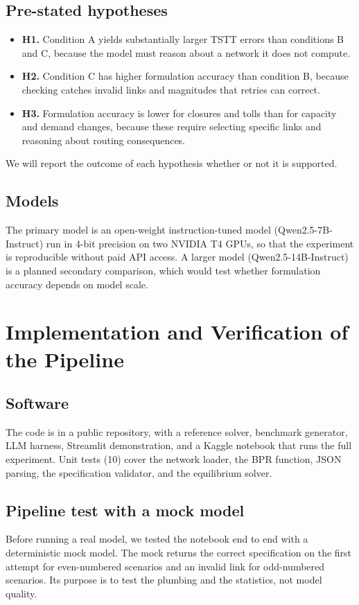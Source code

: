 \documentclass[11pt,a4paper]{article}
\begin{document}
\subsection{Pre-stated hypotheses}
\begin{itemize}[leftmargin=1.5em]
\item \textbf{H1.} Condition A yields substantially larger TSTT errors than conditions B and C, because the model must reason about a network it does not compute.
\item \textbf{H2.} Condition C has higher formulation accuracy than condition B, because checking catches invalid links and magnitudes that retries can correct.
\item \textbf{H3.} Formulation accuracy is lower for closures and tolls than for capacity and demand changes, because these require selecting specific links and reasoning about routing consequences.
\end{itemize}
We will report the outcome of each hypothesis whether or not it is supported.

\subsection{Models}
The primary model is an open-weight instruction-tuned model (Qwen2.5-7B-Instruct) run in 4-bit precision on two NVIDIA T4 GPUs, so that the experiment is reproducible without paid API access. A larger model (Qwen2.5-14B-Instruct) is a planned secondary comparison, which would test whether formulation accuracy depends on model scale.

\section{Implementation and Verification of the Pipeline}
\subsection{Software}
The code is in a public repository, with a reference solver, benchmark generator, LLM harness, Streamlit demonstration, and a Kaggle notebook that runs the full experiment. Unit tests (10) cover the network loader, the BPR function, JSON parsing, the specification validator, and the equilibrium solver.

\subsection{Pipeline test with a mock model}
Before running a real model, we tested the notebook end to end with a deterministic mock model. The mock returns the correct specification on the first attempt for even-numbered scenarios and an invalid link for odd-numbered scenarios. Its purpose is to test the plumbing and the statistics, not model quality.
\end{document}
